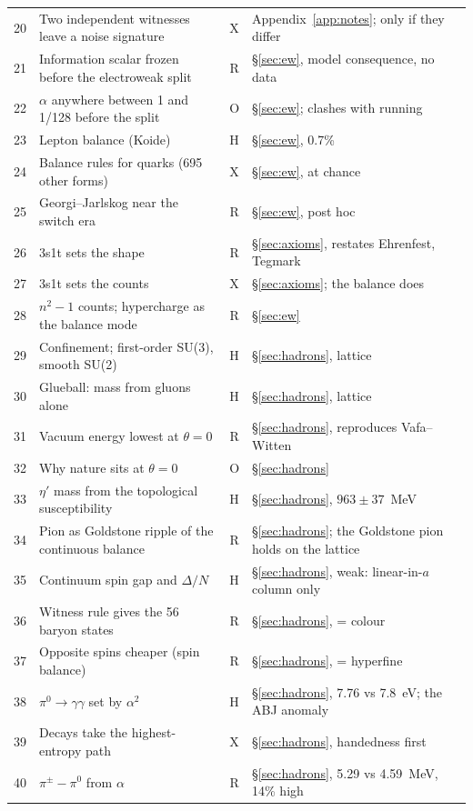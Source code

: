 \documentclass[11pt,a4paper]{article}
\begin{document}
{\begin{longtable}{@{}rp{8.4cm}cp{4.6cm}@{}}
20 & Two independent witnesses leave a noise signature & X & Appendix~\ref{app:notes}; only if they differ \\
21 & Information scalar frozen before the electroweak split & R & \S\ref{sec:ew}, model consequence, no data \\
22 & $\alpha$ anywhere between 1 and 1/128 before the split & O & \S\ref{sec:ew}; clashes with running \\
23 & Lepton balance (Koide) & H & \S\ref{sec:ew}, 0.7\% \\
24 & Balance rules for quarks (695 other forms) & X & \S\ref{sec:ew}, at chance \\
25 & Georgi--Jarlskog near the switch era & R & \S\ref{sec:ew}, post hoc \\
26 & 3s1t sets the shape & R & \S\ref{sec:axioms}, restates Ehrenfest, Tegmark \\
27 & 3s1t sets the counts & X & \S\ref{sec:axioms}; the balance does \\
28 & $n^2-1$ counts; hypercharge as the balance mode & R & \S\ref{sec:ew} \\
29 & Confinement; first-order SU(3), smooth SU(2) & H & \S\ref{sec:hadrons}, lattice \\
30 & Glueball: mass from gluons alone & H & \S\ref{sec:hadrons}, lattice \\
31 & Vacuum energy lowest at $\theta=0$ & R & \S\ref{sec:hadrons}, reproduces Vafa--Witten \\
32 & Why nature sits at $\theta=0$ & O & \S\ref{sec:hadrons} \\
33 & $\eta'$ mass from the topological susceptibility & H & \S\ref{sec:hadrons}, $963\pm37$~MeV \\
34 & Pion as Goldstone ripple of the continuous balance & R & \S\ref{sec:hadrons}; the Goldstone pion holds on the lattice \\
35 & Continuum spin gap and $\Delta/N$ & H & \S\ref{sec:hadrons}, weak: linear-in-$a$ column only \\
36 & Witness rule gives the 56 baryon states & R & \S\ref{sec:hadrons}, = colour \\
37 & Opposite spins cheaper (spin balance) & R & \S\ref{sec:hadrons}, = hyperfine \\
38 & $\pi^0\to\gamma\gamma$ set by $\alpha^2$ & H & \S\ref{sec:hadrons}, 7.76 vs 7.8~eV; the ABJ anomaly \\
39 & Decays take the highest-entropy path & X & \S\ref{sec:hadrons}, handedness first \\
40 & $\pi^\pm-\pi^0$ from $\alpha$ & R & \S\ref{sec:hadrons}, 5.29 vs 4.59~MeV, 14\% high \\

\end{longtable}}
\end{document}
